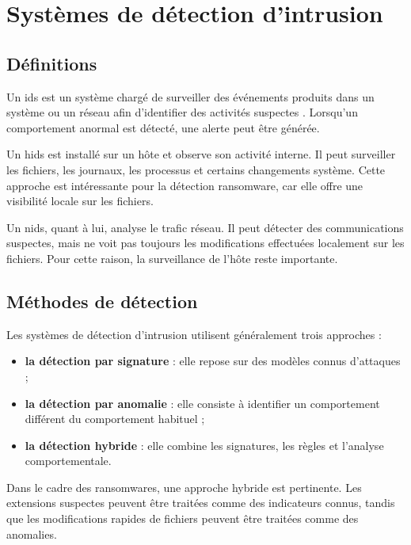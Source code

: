 \section{Systèmes de détection d'intrusion}

\subsection{Définitions}

Un \gls{ids} est un système chargé de surveiller des événements produits dans un système ou un réseau afin d'identifier des activités suspectes \cite{nistIncidentResponse2024}. Lorsqu'un comportement anormal est détecté, une \gls{alerte} peut être générée.


\noindent Un \gls{hids} est installé sur un hôte et observe son activité interne. Il peut surveiller les fichiers, les journaux, les processus et certains changements système. Cette approche est intéressante pour la détection ransomware, car elle offre une visibilité locale sur les fichiers.

\noindent Un \gls{nids}, quant à lui, analyse le trafic réseau. Il peut détecter des communications suspectes, mais ne voit pas toujours les modifications effectuées localement sur les fichiers. Pour cette raison, la surveillance de l'hôte reste importante.

\subsection{Méthodes de détection}

Les systèmes de détection d'intrusion utilisent généralement trois approches :

\begin{itemize}
    \item \textbf{la détection par signature} : elle repose sur des modèles connus d'attaques ;
    \item \textbf{la détection par anomalie} : elle consiste à identifier un comportement différent du comportement habituel ;
    \item \textbf{la détection hybride} : elle combine les signatures, les règles et l'analyse comportementale.
\end{itemize}

\noindent Dans le cadre des ransomwares, une approche hybride est pertinente. Les extensions suspectes peuvent être traitées comme des indicateurs connus, tandis que les modifications rapides de fichiers peuvent être traitées comme des anomalies.

